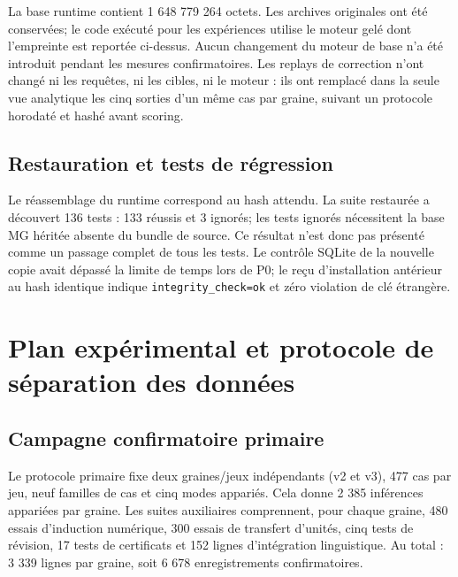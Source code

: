 \documentclass[11pt,a4paper]{article}
\begin{document}
La base runtime contient 1 648 779 264 octets. Les archives originales ont été conservées; le code exécuté pour les expériences utilise le moteur gelé dont l’empreinte est reportée ci-dessus. Aucun changement du moteur de base n’a été introduit pendant les mesures confirmatoires. Les replays de correction n’ont changé ni les requêtes, ni les cibles, ni le moteur : ils ont remplacé dans la seule vue analytique les cinq sorties d’un même cas par graine, suivant un protocole horodaté et hashé avant scoring.

\subsection{Restauration et tests de régression}

Le réassemblage du runtime correspond au hash attendu. La suite restaurée a découvert 136 tests : 133 réussis et 3 ignorés; les tests ignorés nécessitent la base MG héritée absente du bundle de source. Ce résultat n’est donc pas présenté comme un passage complet de tous les tests. Le contrôle SQLite de la nouvelle copie avait dépassé la limite de temps lors de P0; le reçu d’installation antérieur au hash identique indique \texttt{integrity\_check=ok} et zéro violation de clé étrangère.

\section{Plan expérimental et protocole de séparation des données}
\subsection{Campagne confirmatoire primaire}
Le protocole primaire fixe deux graines/jeux indépendants (v2 et v3), 477 cas par jeu, neuf familles de cas et cinq modes appariés. Cela donne 2 385 inférences appariées par graine. Les suites auxiliaires comprennent, pour chaque graine, 480 essais d’induction numérique, 300 essais de transfert d’unités, cinq tests de révision, 17 tests de certificats et 152 lignes d’intégration linguistique. Au total : 3 339 lignes par graine, soit 6 678 enregistrements confirmatoires.
\end{document}
